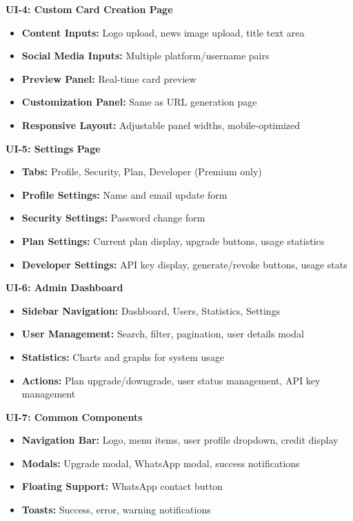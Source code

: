 \documentclass[12pt,a4paper]{article}
\begin{document}
\textbf{UI-4: Custom Card Creation Page}
\begin{itemize}
    \item \textbf{Content Inputs:} Logo upload, news image upload, title text area
    \item \textbf{Social Media Inputs:} Multiple platform/username pairs
    \item \textbf{Preview Panel:} Real-time card preview
    \item \textbf{Customization Panel:} Same as URL generation page
    \item \textbf{Responsive Layout:} Adjustable panel widths, mobile-optimized
\end{itemize}

\textbf{UI-5: Settings Page}
\begin{itemize}
    \item \textbf{Tabs:} Profile, Security, Plan, Developer (Premium only)
    \item \textbf{Profile Settings:} Name and email update form
    \item \textbf{Security Settings:} Password change form
    \item \textbf{Plan Settings:} Current plan display, upgrade buttons, usage statistics
    \item \textbf{Developer Settings:} API key display, generate/revoke buttons, usage stats
\end{itemize}

\textbf{UI-6: Admin Dashboard}
\begin{itemize}
    \item \textbf{Sidebar Navigation:} Dashboard, Users, Statistics, Settings
    \item \textbf{User Management:} Search, filter, pagination, user details modal
    \item \textbf{Statistics:} Charts and graphs for system usage
    \item \textbf{Actions:} Plan upgrade/downgrade, user status management, API key management
\end{itemize}

\textbf{UI-7: Common Components}
\begin{itemize}
    \item \textbf{Navigation Bar:} Logo, menu items, user profile dropdown, credit display
    \item \textbf{Modals:} Upgrade modal, WhatsApp modal, success notifications
    \item \textbf{Floating Support:} WhatsApp contact button
    \item \textbf{Toasts:} Success, error, warning notifications
\end{itemize}
\end{document}
